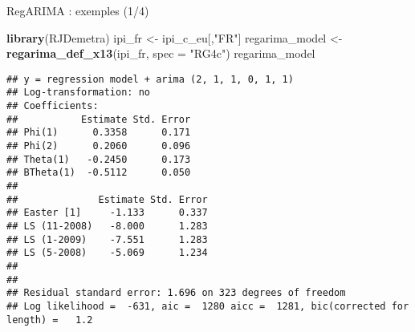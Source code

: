 \documentclass[10pt,xcolor=table,color={dvipsnames,usenames},ignorenonframetext,usepdftitle=false,french]{beamer}
\newenvironment{Shaded}{\begin{snugshade}}{\end{snugshade}}
\newcommand{\DataTypeTok}[1]{\textcolor[rgb]{0.13,0.29,0.53}{#1}}
\newcommand{\KeywordTok}[1]{\textcolor[rgb]{0.13,0.29,0.53}{\textbf{#1}}}
\newcommand{\NormalTok}[1]{#1}
\newcommand{\StringTok}[1]{\textcolor[rgb]{0.31,0.60,0.02}{#1}}
\begin{document}
\begin{frame}[fragile]{RegARIMA : exemples (1/4)}
\protect\hypertarget{regarima-exemples-14}{}

\begin{Shaded}
\begin{Highlighting}[]
\KeywordTok{library}\NormalTok{(RJDemetra)}
\NormalTok{ipi_fr <-}\StringTok{ }\NormalTok{ipi_c_eu[,}\StringTok{"FR"}\NormalTok{]}
\NormalTok{regarima_model <-}\StringTok{ }\KeywordTok{regarima_def_x13}\NormalTok{(ipi_fr, }\DataTypeTok{spec =} \StringTok{"RG4c"}\NormalTok{)}
\NormalTok{regarima_model}
\end{Highlighting}
\end{Shaded}

\begin{verbatim}
## y = regression model + arima (2, 1, 1, 0, 1, 1)
## Log-transformation: no
## Coefficients:
##           Estimate Std. Error
## Phi(1)      0.3358      0.171
## Phi(2)      0.2060      0.096
## Theta(1)   -0.2450      0.173
## BTheta(1)  -0.5112      0.050
## 
##              Estimate Std. Error
## Easter [1]     -1.133      0.337
## LS (11-2008)   -8.000      1.283
## LS (1-2009)    -7.551      1.283
## LS (5-2008)    -5.069      1.234
## 
## 
## Residual standard error: 1.696 on 323 degrees of freedom
## Log likelihood =  -631, aic =  1280 aicc =  1281, bic(corrected for length) =   1.2
\end{verbatim}

\end{frame}
\end{document}
